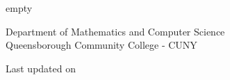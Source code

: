 
\let\cleardoublepage

\thispagestyle{empty}%

	\vspace*{0.1\textheight}
	\begin{center}\leavevmode
		\normalfont
		{\HUGE\raggedright \textbf{\@title}\par}%
		\hrulefill\par
		{\huge\raggedleft {\@author}\par}%
		\vskip 1cm
	\end{center}%

	\vfill

	\begin{center}\large
		Department of Mathematics and Computer Science\\

		Queensborough Community College - CUNY\\

		\the\year
	\end{center}

	\vspace*{2\baselineskip}

  \begin{center}
    {\color{blue} 
      Last updated on \lastupdated{\today}
    }
   \end{center}

   \newpage